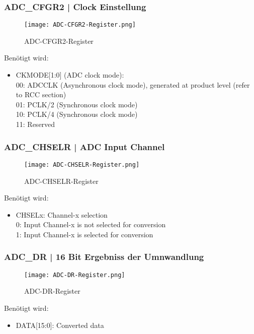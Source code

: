 \newpage
        \subsubsection{ADC\_CFGR2 | Clock Einstellung}
            \begin{figure}[!htb]
                \centering
                \texttt{[image: ADC-CFGR2-Register.png]}
                \caption{ADC-CFGR2-Register}
                \label{caption:ADC-CFGR2-Register}
            \end{figure}
            \noindent Benötigt wird:
            \begin{itemize}
                \item CKMODE[1:0] (ADC clock mode):\\
                00: ADCCLK (Asynchronous clock mode), generated at product level (refer to RCC section)\\
                01: PCLK/2 (Synchronous clock mode)\\
                10: PCLK/4 (Synchronous clock mode)\\
                11: Reserved
            \end{itemize}


        \subsubsection{ADC\_CHSELR | ADC Input Channel}
            \begin{figure}[!htb]
                \centering
                \texttt{[image: ADC-CHSELR-Register.png]}
                \caption{ADC-CHSELR-Register}
                \label{caption:ADC-CHSELR-Register}
            \end{figure} 
            \noindent Benötigt wird:
            \begin{itemize}
                \item CHSELx: Channel-x selection\\
                0: Input Channel-x is not selected for conversion\\
                1: Input Channel-x is selected for conversion
            \end{itemize}

\newpage
        \subsubsection{ADC\_DR | 16 Bit Ergebniss der Umnwandlung}
            \begin{figure}[!htb]
                \centering
                \texttt{[image: ADC-DR-Register.png]}
                \caption{ADC-DR-Register}
                \label{caption:ADC-DR-Register}
            \end{figure}
            \noindent Benötigt wird:
            \begin{itemize}
                \item DATA[15:0]: Converted data
            \end{itemize}
            
